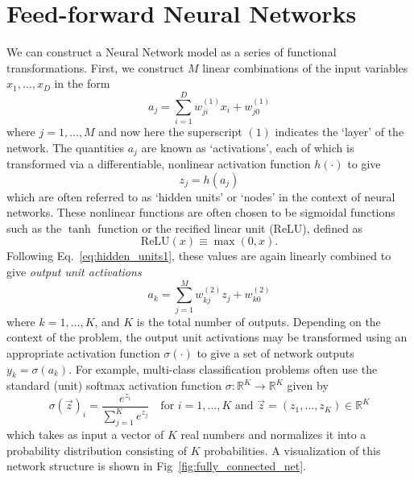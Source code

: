 \documentclass[../main.tex]{subfiles}
\begin{document}
\section{Feed-forward Neural Networks}
We can construct a Neural Network model as a series of functional transformations.
%
First, we construct $M$ linear combinations of the input variables $x_{1}, \ldots, x_{D}$ in the form
%
\begin{equation}
  a_{j} = \sum_{i=1}^{D} w_{ji}^{(1)} x_{i} + w_{j0}^{(1)}
  \label{eq:activations1}
\end{equation}
%
where $j = 1, \ldots, M$ and now here the superscript $(1)$ indicates the `layer' of the network.
%
The quantities $a_j$ are known as `activations', each of which is transformed via a differentiable, nonlinear
activation function $h(\cdot)$ to give
%
\begin{equation}
  z_{j} = h(a_{j})
  \label{eq:hidden_units1}
\end{equation}
%
which are often referred to as `hidden units' or `nodes' in the context of neural networks.
%
These nonlinear functions are often chosen to be sigmoidal functions such as the $\tanh$ function or the recified
linear unit (ReLU), defined as
%
\begin{equation}
  \mathrm{ReLU}(x) \equiv \max{(0, x)}.
\end{equation}
%
Following Eq.~\ref{eq:hidden_units1}, these values are again linearly combined to give \emph{output unit activations}
%
\begin{equation}
  a_{k} = \sum_{j=1}^{M} w_{kj}^{(2)} z_{j} + w_{k0}^{(2)}
\end{equation}
%
where $k = 1, \ldots, K$, and $K$ is the total number of outputs. Depending on the context of the problem, the output
unit activations may be transformed using an appropriate activation function $\sigma(\cdot)$ to give a set of network
outputs $y_{k} = \sigma(a_{k})$.
%
For example, multi-class classification problems often use the standard (unit) softmax activation function $\sigma:
\mathbb{R}^{K} \rightarrow \mathbb{R}^{K}$ given by
%
\begin{equation}
  \sigma{(\vec{z})}_{i} = \frac{e^{z_{i}}}{\sum_{j=1}^{K} e^{z_{j}}}\quad \mathrm{for}\,\, i = 1, \ldots, K\,\,
  \mathrm{and} \,\, \vec{z} = {(z_1, \ldots, z_{K})} \in \mathbb{R}^{K}
\end{equation}
%
which takes as input a vector of $K$ real numbers and normalizes it into a probability distribution consisting of $K$
probabilities.
%
A visualization of this network structure is shown in Fig~\ref{fig:fully_connected_net}.
\end{document}
